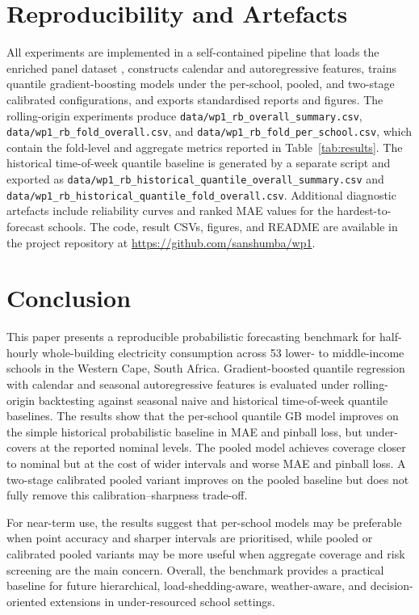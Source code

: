 \documentclass[12pt,a4paper]{article}
\begin{document}
\section{Reproducibility and Artefacts}

All experiments are implemented in a self-contained pipeline that loads the enriched panel dataset \citep{samuels2025dataset}, constructs calendar and autoregressive features, trains quantile gradient-boosting models under the per-school, pooled, and two-stage calibrated configurations, and exports standardised reports and figures. The rolling-origin experiments produce \texttt{data/wp1\_rb\_overall\_summary.csv}, \texttt{data/wp1\_rb\_fold\_overall.csv}, and \texttt{data/wp1\_rb\_fold\_per\_school.csv}, which contain the fold-level and aggregate metrics reported in Table~\ref{tab:results}. The historical time-of-week quantile baseline is generated by a separate script and exported as \texttt{data/wp1\_rb\_historical\_quantile\_overall\_summary.csv} and \texttt{data/wp1\_rb\_historical\_quantile\_fold\_overall.csv}. Additional diagnostic artefacts include reliability curves and ranked MAE values for the hardest-to-forecast schools. The code, result CSVs, figures, and README are available in the project repository at \url{https://github.com/sanshumba/wp1}.

\section{Conclusion}

This paper presents a reproducible probabilistic forecasting benchmark for half-hourly whole-building electricity consumption across 53 lower- to middle-income schools in the Western Cape, South Africa. Gradient-boosted quantile regression with calendar and seasonal autoregressive features is evaluated under rolling-origin backtesting against seasonal naive and historical time-of-week quantile baselines. The results show that the per-school quantile GB model improves on the simple historical probabilistic baseline in MAE and pinball loss, but under-covers at the reported nominal levels. The pooled model achieves coverage closer to nominal but at the cost of wider intervals and worse MAE and pinball loss. A two-stage calibrated pooled variant improves on the pooled baseline but does not fully remove this calibration--sharpness trade-off.

For near-term use, the results suggest that per-school models may be preferable when point accuracy and sharper intervals are prioritised, while pooled or calibrated pooled variants may be more useful when aggregate coverage and risk screening are the main concern. Overall, the benchmark provides a practical baseline for future hierarchical, load-shedding-aware, weather-aware, and decision-oriented extensions in under-resourced school settings.



\end{document}
